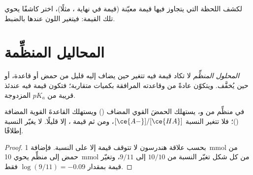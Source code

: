 \begin{method}\label{met:g12:buffers-predominance:indicator}
لكشف اللحظة التي يتجاوز فيها  قيمة  معيّنة (قيمة  في نهاية
، مثلًا)، اختر كاشفًا يحوي 
تلك القيمة: فيتغير اللون عندها بالضبط.
\end{method}

\section{المحاليل المنظِّمة}

\begin{definition}\label{def:g12:buffers-predominance:buffer}
\emph{المحلول المنظِّم}  لا تكاد قيمة  فيه
تتغير حين يضاف إليه قليل من حمض أو قاعدة، أو حين
يُخفَّف. ويتكوّن عادةً من  وقاعدته المرافقة بكميات
متقاربة؛ فتكون قيمة  فيه عندئذ قريبة من $pK_a$ المزدوجة.
\end{definition}

\begin{proposition}\label{prop:g12:buffers-predominance:buffer}
في  منظِّم من  و، يستهلك  الحمضَ القوي المضاف
() ويستهلك  القاعدةَ القوية المضافة
()؛ فلا تتغير النسبة $[\ce{A-}]/[\ce{HA}]$، ومن ثم
قيمة ، إلا قليلًا.  لا يغيّر النسبة إطلاقًا.
\end{proposition}

\begin{proof}
بحسب علاقة هندرسون لا تتوقف قيمة  إلا على النسبة. فإضافة
\qty{1}{mmol} من حمض إلى  منظِّم يحوي \qty{10}{mmol} من كل شكل
تغيّر النسبة من $10/10$ إلى $9/11$، وتغيّر قيمة  بمقدار
$\log(9/11) = -0.09$ فقط.
\end{proof}

